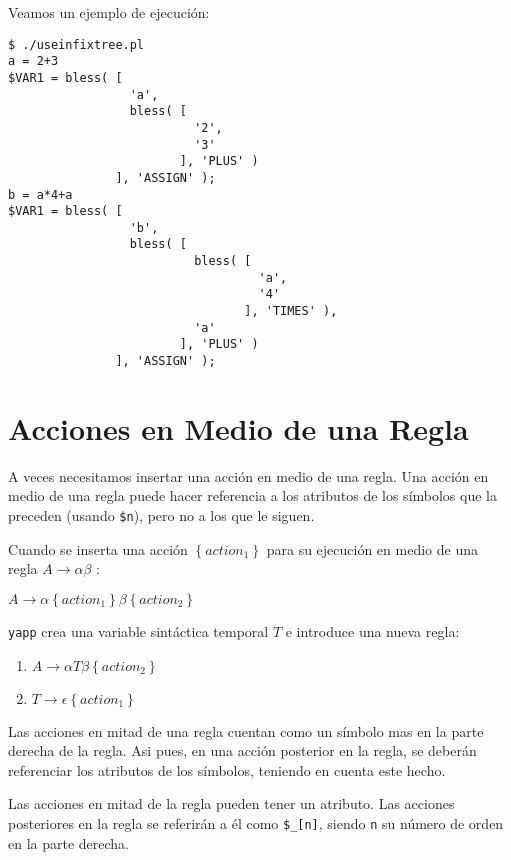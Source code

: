 Veamos un ejemplo de ejecución:
\begin{verbatim}
$ ./useinfixtree.pl
a = 2+3
$VAR1 = bless( [
                 'a',
                 bless( [
                          '2',
                          '3'
                        ], 'PLUS' )
               ], 'ASSIGN' );
b = a*4+a
$VAR1 = bless( [
                 'b',
                 bless( [
                          bless( [
                                   'a',
                                   '4'
                                 ], 'TIMES' ),
                          'a'
                        ], 'PLUS' )
               ], 'ASSIGN' );
\end{verbatim}

\section{Acciones en Medio de una Regla}
A veces necesitamos insertar una acción en medio de una regla.
Una acción en medio de una regla puede hacer referencia a los atributos de
los símbolos que la preceden (usando \verb|$n|), pero no a los que le siguen.

Cuando se  inserta una acción $\left \{ action_1\right \}$
para su ejecución en medio de una regla $A \rightarrow \alpha
\beta$ :
\begin{center}
$A \rightarrow \alpha \left \{ action_1 \right \} \beta \left \{ action_2\right \}$ 
\end{center}
\verb|yapp| crea una variable sintáctica temporal $T$ e introduce una nueva regla:

\begin{center}
\begin{enumerate}
\item
$A \rightarrow \alpha T \beta \left \{ action_2\right \}$ 
\item
$T \rightarrow \epsilon \left \{ action_1 \right \}$ 
\end{enumerate}
\end{center}

Las acciones en mitad de una regla cuentan como un símbolo mas en la parte 
derecha de la regla. Asi pues, en una acción posterior en la regla,
se deberán referenciar los  atributos de los símbolos, teniendo en cuenta este hecho.

Las acciones en mitad de la regla pueden tener un atributo. 
Las acciones posteriores
en la regla se referirán a él como \verb|$_[n]|, siendo \verb|n| su número de orden
en la parte derecha. 

